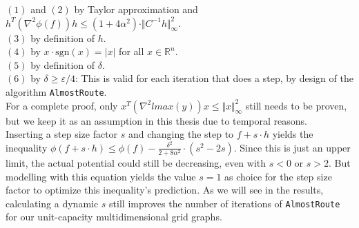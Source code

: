 $(1)$ and $(2)$ by Taylor approximation and $h^T(\nabla^2\phi(f))h\leq (1+4\alpha^2)\cdot \Vert C^{-1}h\Vert_\infty^2$.\\
$(3)$ by definition of $h$.\\
$(4)$ by $x\cdot \text{sgn}(x)=\vert x\vert$ for all $x\in\mathbb{R}^n$.\\
$(5)$ by definition of $\delta$.\\
$(6)$ by $\delta\geq \varepsilon/4$: This is valid for each iteration that does a step, by design of the algorithm \texttt{AlmostRoute}.\\
For a complete proof, only $x^T(\nabla^2 lmax(y))x\leq \Vert x\Vert_\infty^2$ still needs to be proven, but we keep it as an assumption in this thesis due to temporal reasons.\\
Inserting a step size factor $s$ and changing the step to $f+s\cdot h$ yields the inequality $\phi(f+s\cdot h)\leq \phi(f)-\frac{\delta^2}{2+8\alpha^2}\cdot (s^2-2s)$. Since this is just an upper limit, the actual potential could still be decreasing, even with $s<0$ or $s>2$. But modelling with this equation yields the value $s=1$ as choice for the step size factor to optimize this inequality's prediction. As we will see in the results, calculating a dynamic $s$ still improves the number of iterations of \texttt{AlmostRoute} for our unit-capacity multidimensional grid graphs.
